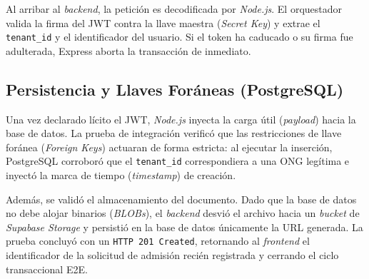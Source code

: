 Al arribar al \textit{backend}, la petici\'on es decodificada por \textit{Node.js}.
El orquestador valida la firma del JWT contra la llave maestra (\textit{Secret Key})
y extrae el \texttt{tenant\_id} y el identificador del usuario. Si el token ha
caducado o su firma fue adulterada, Express aborta la transacci\'on de inmediato.

\subsection{Persistencia y Llaves For\'aneas (PostgreSQL)}

Una vez declarado l\'icito el JWT, \textit{Node.js} inyecta la carga \'util
(\textit{payload}) hacia la base de datos. La prueba de integraci\'on verific\'o que
las restricciones de llave for\'anea (\textit{Foreign Keys}) actuaran de forma
estricta: al ejecutar la inserci\'on, PostgreSQL corrobor\'o que el
\texttt{tenant\_id} correspondiera a una ONG leg\'itima e inyect\'o la marca de
tiempo (\textit{timestamp}) de creaci\'on.

Adem\'as, se valid\'o el almacenamiento del documento. Dado que la base de datos no
debe alojar binarios (\textit{BLOBs}), el \textit{backend} desvi\'o el archivo hacia
un \textit{bucket} de \textit{Supabase Storage} y persisti\'o en la base de datos
\'unicamente la URL generada. La prueba concluy\'o con un \texttt{HTTP 201 Created},
retornando al \textit{frontend} el identificador de la solicitud de admisi\'on reci\'en
registrada y cerrando el ciclo transaccional E2E.
